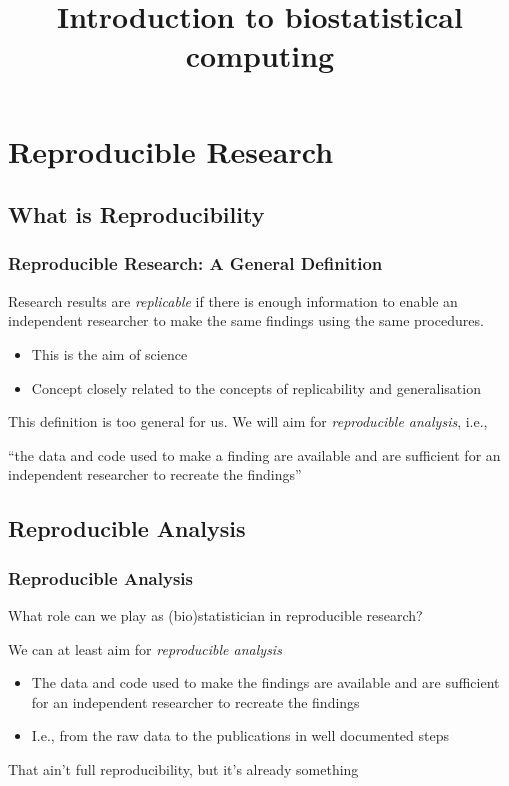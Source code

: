 \documentclass[paper=screen,mathserif]{beamer}\usepackage[]{graphicx}\usepackage[]{color}
\title{Introduction to biostatistical computing}
\institute[]{\scriptsize{\url{arthur.allignol@uni-ulm.de}}}
\date{}
\begin{document}

\newcommand{\titlep}{yes}  %

{
\renewcommand{\insertframenumber}{}   %
\begin{frame}
\addtocounter{framenumber}{-1}
\titlepage
\end{frame}
}


\frame{\tableofcontents[currentsection]}

\section{Reproducible Research}

\subsection{What is Reproducibility}

\begin{frame}
  \frametitle{Reproducible Research: A General Definition}
  Research results are {\em replicable} if there is enough information
  to enable an independent researcher to make the same findings using
  the same procedures.
  \begin{itemize}
  \item This is the aim of science
  \item Concept closely related to the concepts of replicability and
    generalisation
  \end{itemize}
  This definition is too general for us. We will aim for {\em
    reproducible analysis}, i.e., 
  
  \begin{center}
    ``the data and code used to make a
    finding are available and are sufficient for an independent
    researcher to recreate the findings''
  \end{center}
\end{frame}

\subsection{Reproducible Analysis}

\begin{frame}
  \frametitle{Reproducible Analysis} 

  What role can we play as (bio)statistician in reproducible
  research?\pause
  
  \vspace{1cm}
  We can at least aim for {\em reproducible analysis}
  \begin{itemize}
  \item The data and code used to make the findings are available and
    are sufficient for an independent researcher to recreate the
    findings
  \item I.e., from the raw data to the publications in well documented
    steps
  \end{itemize}\vspace{0.5cm}
  That ain't full reproducibility, but it's already something
\end{frame}
\end{document}
